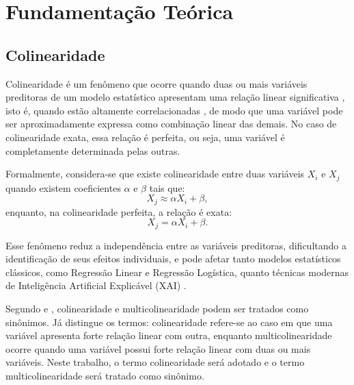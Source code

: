 
\chapter[Fundamentação Teórica]{Fundamentação Teórica}

\section{Colinearidade}\label{sec:colineariedade}

Colinearidade é um fenômeno que ocorre quando duas ou mais variáveis preditoras de um modelo estatístico apresentam uma relação linear significativa \cite{Carsten2012Collinearity}, isto é, quando estão altamente correlacionadas \cite{Das2019Analysis,Vatcheva2016Multicollinearity,Streukens2023Multicollinearity}, de modo que uma variável pode ser aproximadamente expressa como combinação linear das demais. No caso de colinearidade exata, essa relação é perfeita, ou seja, uma variável é completamente determinada pelas outras.

Formalmente, considera-se que existe colinearidade entre duas variáveis $X_i$ e $X_j$ quando existem coeficientes $\alpha$ e $\beta$ tais que:
\begin{equation}
	X_j \approx \alpha X_i + \beta,
\end{equation}
enquanto, na colinearidade perfeita, a relação é exata:
\begin{equation}
	X_j = \alpha X_i + \beta.
\end{equation}

Esse fenômeno reduz a independência entre as variáveis preditoras, dificultando a identificação de seus efeitos individuais, e pode afetar tanto modelos estatísticos clássicos, como Regressão Linear e Regressão Logística, quanto técnicas modernas de Inteligência Artificial Explicável (XAI) \cite{salih2025a_perpective}.

Segundo  e , colinearidade e multicolinearidade podem ser tratados como sinônimos. Já  distingue os termos: colinearidade refere-se ao caso em que uma variável apresenta forte relação linear com outra, enquanto multicolinearidade ocorre quando uma variável possui forte relação linear com duas ou mais variáveis. Neste trabalho, o termo colinearidade será adotado e o termo multicolinearidade será tratado como sinônimo.

